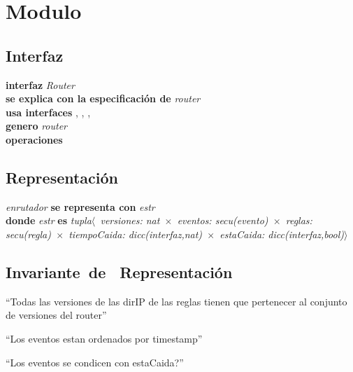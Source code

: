 \section*{Modulo }

\vspace{22pt}

\subsection*{Interfaz}
\textbf{interfaz} \textit{Router}\\
\textbf{se explica con la especificaci\'on de} \textit{router}\\
\textbf{usa interfaces} , , 		, \\
\textbf{genero} \textit{router}\\
\textbf{operaciones}

\subsection*{Representaci\'on}
\textit{enrutador} \textbf{se representa con} \textit{estr}\\
\textbf{donde} \textit{estr} \textbf{es} \textit{tupla$\langle$\ versiones: nat\ 	$\times$\ eventos: secu(evento)\ $\times$\ reglas: secu(regla)\ $\times$\ tiempoCaida: dicc(interfaz,nat)\ $\times$\ estaCaida: dicc(interfaz,bool)$\rangle$}

\subsection*{Invariante\ de \ Representaci\'on}
\vspace{11pt}

\vspace{33pt}
\otrasops

``Todas las versiones de las dirIP de las reglas tienen que pertenecer al conjunto de versiones del router''

``Los eventos estan ordenados por timestamp''

``Los eventos se condicen con estaCaida?''

